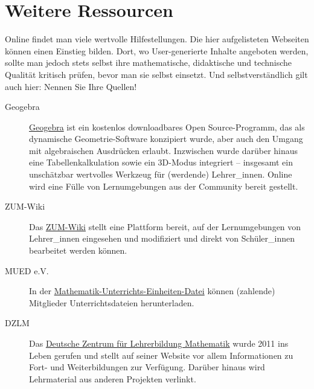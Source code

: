 \documentclass[ngerman,bibliography=totoc,oneside,12pt,a4paper]{scrbook}
\begin{document}
\section{Weitere Ressourcen}\label{weitere-ressourcen}

Online findet man viele wertvolle Hilfestellungen. Die hier
aufgelisteten Webseiten können einen Einstieg bilden. Dort, wo
User-generierte Inhalte angeboten werden, sollte man jedoch stets selbst
ihre mathematische, didaktische und technische Qualität kritisch prüfen,
bevor man sie selbst einsetzt. Und selbstverständlich gilt auch hier:
Nennen Sie Ihre Quellen!

\begin{description}
\item[Geogebra]
\href{https://www.geogebra.org}{Geogebra} ist ein kostenlos
downloadbares Open Source-Programm, das als dynamische
Geometrie-Software konzipiert wurde, aber auch den Umgang mit
algebraischen Ausdrücken erlaubt. Inzwischen wurde darüber hinaus eine
Tabellenkalkulation sowie ein 3D-Modus integriert -- insgesamt ein
unschätzbar wertvolles Werkzeug für (werdende) Lehrer\_innen. Online
wird eine Fülle von Lernumgebungen aus der Community bereit gestellt.
\item[ZUM-Wiki]
Das \href{https://wiki.zum.de}{ZUM-Wiki} stellt eine Plattform bereit,
auf der Lernumgebungen von Lehrer\_innen eingesehen und modifiziert und
direkt von Schüler\_innen bearbeitet werden können.
\item[MUED e.V.]
In der
\href{https://www.mued.de}{Mathematik-Unterrichts-Einheiten-Datei}
können (zahlende) Mitglieder Unterrichtsdateien herunterladen.
\item[DZLM]
Das \href{https://www.dzlm.de}{Deutsche Zentrum für Lehrerbildung
Mathematik} wurde 2011 ins Leben gerufen und stellt auf seiner Website
vor allem Informationen zu Fort- und Weiterbildungen zur Verfügung.
Darüber hinaus wird Lehrmaterial aus anderen Projekten verlinkt.
\end{description}

\printbibliography
\end{document}
